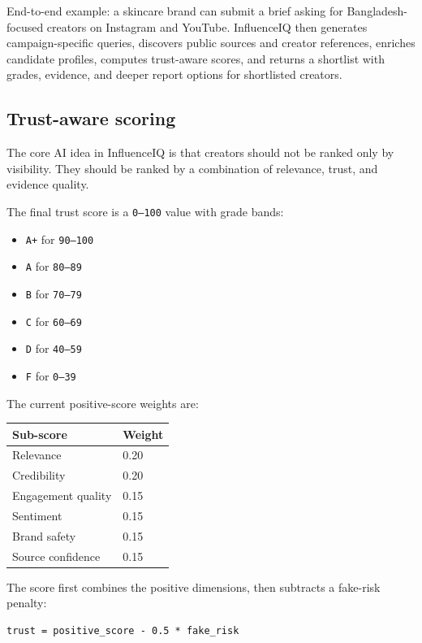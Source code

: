 \documentclass[11pt,a4paper]{article}
\begin{document}
End-to-end example: a skincare brand can submit a brief asking for Bangladesh-focused creators on Instagram and YouTube. InfluenceIQ then generates campaign-specific queries, discovers public sources and creator references, enriches candidate profiles, computes trust-aware scores, and returns a shortlist with grades, evidence, and deeper report options for shortlisted creators.

\subsection{Trust-aware scoring}

The core AI idea in InfluenceIQ is that creators should not be ranked only by visibility. They should be ranked by a combination of relevance, trust, and evidence quality.

The final trust score is a \texttt{0--100} value with grade bands:

\begin{itemize}
  \item \texttt{A+} for \texttt{90--100}
  \item \texttt{A} for \texttt{80--89}
  \item \texttt{B} for \texttt{70--79}
  \item \texttt{C} for \texttt{60--69}
  \item \texttt{D} for \texttt{40--59}
  \item \texttt{F} for \texttt{0--39}
\end{itemize}

The current positive-score weights are:

\begin{center}
\begin{tabular}{ll}
\toprule
\textbf{Sub-score} & \textbf{Weight} \\
\midrule
Relevance & 0.20 \\
Credibility & 0.20 \\
Engagement quality & 0.15 \\
Sentiment & 0.15 \\
Brand safety & 0.15 \\
Source confidence & 0.15 \\
\bottomrule
\end{tabular}
\end{center}

The score first combines the positive dimensions, then subtracts a fake-risk penalty:

\begin{Verbatim}[fontsize=\small,frame=single,framesep=4mm]
trust = positive_score - 0.5 * fake_risk
\end{Verbatim}
\end{document}
